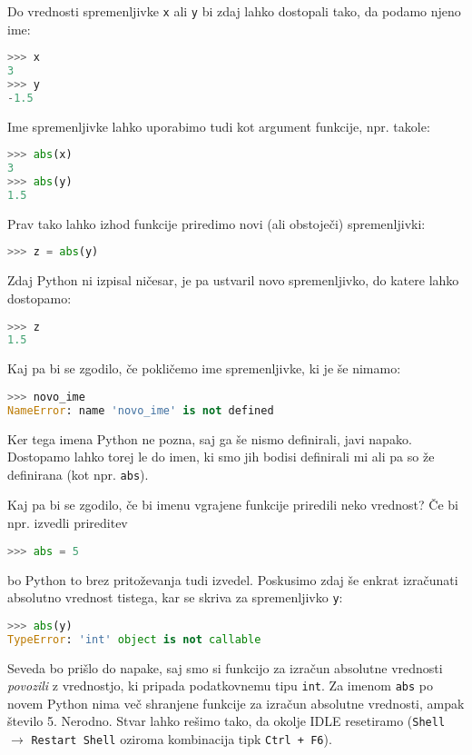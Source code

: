 Do vrednosti spremenljivke \texttt{x} ali \texttt{y} bi zdaj lahko dostopali tako, da podamo njeno ime:
\begin{lstlisting}[language=Python]
>>> x
3
>>> y
-1.5
\end{lstlisting}
Ime spremenljivke lahko uporabimo tudi kot argument funkcije, npr. takole:
\begin{lstlisting}[language=Python]
>>> abs(x)
3
>>> abs(y)
1.5
\end{lstlisting}
Prav tako lahko izhod funkcije priredimo novi (ali obstoječi) spremenljivki:
\begin{lstlisting}[language=Python]
>>> z = abs(y)
\end{lstlisting}
Zdaj Python ni izpisal ničesar, je pa ustvaril novo spremenljivko, do katere lahko dostopamo:
\begin{lstlisting}[language=Python]
>>> z
1.5
\end{lstlisting}
Kaj pa bi se zgodilo, če pokličemo ime spremenljivke, ki je še nimamo:
\begin{lstlisting}[language=Python]
>>> novo_ime
NameError: name 'novo_ime' is not defined
\end{lstlisting}
Ker tega imena Python ne pozna, saj ga še nismo definirali, javi napako. Dostopamo lahko torej le do imen, ki smo jih bodisi definirali mi ali pa so že definirana (kot npr. \texttt{abs}). 

Kaj pa bi se zgodilo, če bi imenu vgrajene funkcije priredili neko vrednost? Če bi npr. izvedli prireditev
\begin{lstlisting}[language=Python]
>>> abs = 5
\end{lstlisting}
bo Python to brez pritoževanja tudi izvedel. Poskusimo zdaj še enkrat izračunati absolutno vrednost tistega, kar se skriva za spremenljivko \texttt{y}:
\begin{lstlisting}[language=Python]
>>> abs(y)
TypeError: 'int' object is not callable
\end{lstlisting}
Seveda bo prišlo do napake, saj smo si funkcijo za izračun absolutne vrednosti \emph{povozili} z vrednostjo, ki pripada podatkovnemu tipu \texttt{int}. Za imenom \texttt{abs} po novem Python nima več shranjene funkcije za izračun absolutne vrednosti, ampak število 5. Nerodno. Stvar lahko rešimo tako, da okolje IDLE resetiramo (\texttt{Shell} $\rightarrow$ \texttt{Restart Shell} oziroma kombinacija tipk \texttt{Ctrl + F6}).

